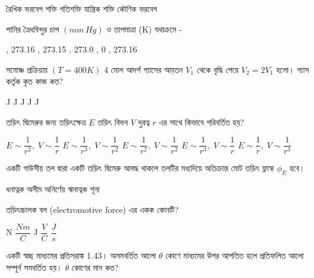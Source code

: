\documentclass[addpoints]{exam}
\begin{document}
\begin{questions}
\begin{oneparchoices}
\choice রৈখিক ভরবেগ
\choice  শক্তি 
\choice গতিশক্তি 
\choice যান্ত্রিক শক্তি
\choice কৌণিক ভরবেগ
\end{oneparchoices}

\question পানির ত্রৈধবিন্দুর চাপ $ ( mm\,Hg )$ ও তাপমাত্রা (K) যথাক্রমে -

\begin{oneparchoices}
, 273.16
, 273.15
, 273.0
, 0
, 273.16
\end{oneparchoices}

\question  সমোষ্ণ প্রক্রিয়ায় $ (T=400K) $ 4 মোল আদর্শ গ্যাসের আয়তন $ V_{1} $ থেকে বৃদ্ধি পেয়ে $ V_{2} = 2V_{1} $ হলো। গ্যাস কর্তৃক কৃত কাজ কত?

\begin{oneparchoices}
 J
 J
 J
 J
 J
\end{oneparchoices}

\question তড়িৎ দ্বিমেরুর জন্য তড়িৎক্ষেত্র $ E $ তড়িৎ বিভব $ V $ দুরত্ব $ r $ এর সাথে কিভাবে পরিবর্তিত হয়?

\begin{oneparchoices}
\choice $ E \sim \dfrac{1}{r^{2}},\; V\sim \dfrac{1}{r} $
\choice $ E \sim \dfrac{1}{r^{3}},\; V\sim \dfrac{1}{r^{2}} $
\choice $ E \sim \dfrac{1}{r^{2}},\; V\sim \dfrac{1}{r^{2}} $
\choice $ E \sim \dfrac{1}{r^{3}},\; V\sim \dfrac{1}{r} $
\choice $ E \sim \dfrac{1}{r},\; V\sim \dfrac{1}{r^{3}} $
\end{oneparchoices}

\question   একটি গাউসীয় তল দ্বারা একটি তড়িৎ দ্বিমেরু আবদ্ধ থাকলে তলটির মধ্যদিয়ে অতিক্রান্ত মোট তড়িৎ ফ্লাস্ক $ \phi_{E} $ হবে।

\begin{oneparchoices}
\choice ধনাত্নক 
\choice অসীম 
\choice অনির্ণেয় 
\choice ঋনাত্বক 
\choice শূন্য
\end{oneparchoices}

\question  তড়িৎচ্চালক বল (electromotive force) এর একক কোনটি?

\begin{oneparchoices}
\choice N
\choice $ \dfrac{Nm}{C} $ 
\choice J
\choice $ \dfrac{V}{C} $
\choice $ \dfrac{J}{s} $  
\end{oneparchoices}

\question  একটি স্বচ্ছ মাধ্যমের প্রতিসরাঙ্ক 1.43।  অসমবর্তিত আলো $ \theta $ কোণে মাধ্যমের উপর আপতিত হলে প্রতিফলিত আলো সম্পূর্ন সমবর্তিত হয়। $ \theta $ কোণের মান কত?


\end{questions}
\end{document}
